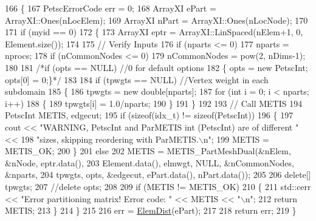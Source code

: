 \begin{DoxyCode}
166 \{
167   PetscErrorCode err = 0;
168   ArrayXI ePart = ArrayXI::Ones(nLocElem);
169   ArrayXI nPart = ArrayXI::Ones(nLocNode);
170 
171   \textcolor{keywordflow}{if} (myid == 0)
172   \{
173     ArrayXI eptr = ArrayXI::LinSpaced(nElem+1, 0, Element.size());
174 
175     \textcolor{comment}{// Verify Inputs}
176     \textcolor{keywordflow}{if} (nparts <= 0)
177       nparts = nprocs;
178     \textcolor{keywordflow}{if} (nCommonNodes <= 0)
179       nCommonNodes = pow(2, nDims-1);
180 
181     \textcolor{comment}{/*if (opts == NULL)                         //0 for default options}
182 \textcolor{comment}{    \{ opts = new PetscInt; opts[0] = 0;\}*/}
183 
184     \textcolor{keywordflow}{if} (tpwgts == NULL)                \textcolor{comment}{//Vertex weight in each subdomain}
185     \{
186       tpwgts = \textcolor{keyword}{new} \textcolor{keywordtype}{double}[nparts];
187       \textcolor{keywordflow}{for} (\textcolor{keywordtype}{int} i = 0; i < nparts; i++)
188       \{
189         tpwgts[i] = 1.0/nparts;
190       \}
191     \}
192 
193     \textcolor{comment}{// Call METIS}
194     PetscInt METIS, edgecut;
195     \textcolor{keywordflow}{if} (\textcolor{keyword}{sizeof}(idx\_t) != \textcolor{keyword}{sizeof}(PetscInt))
196     \{
197       cout << \textcolor{stringliteral}{"WARNING, PetscInt and ParMETIS int (PetscInt) are of different "} <<
198               \textcolor{stringliteral}{"sizes, skipping reordering with ParMETIS.\(\backslash\)n"};
199       METIS = METIS\_OK;
200     \}
201     \textcolor{keywordflow}{else}
202       METIS = METIS\_PartMeshDual(&nElem, &nNode, eptr.data(),
203               Element.data(), elmwgt, NULL, &nCommonNodes, &nparts,
204           tpwgts, opts, &edgecut, ePart.data(), nPart.data());
205 
206     \textcolor{keyword}{delete}[] tpwgts;
207     \textcolor{comment}{//delete opts;}
208 
209     \textcolor{keywordflow}{if} (METIS != METIS\_OK)
210     \{
211       std::cerr << \textcolor{stringliteral}{"Error partitioning matrix! Error code: "} << METIS << \textcolor{stringliteral}{"\(\backslash\)n"};
212       \textcolor{keywordflow}{return} METIS;
213     \}
214   \}
215 
216   err = \mbox{\hyperlink{class_mesh_a1c915802d56c4ded24e460e83cfb5399}{ElemDist}}(ePart);
217 
218   \textcolor{keywordflow}{return} err;
219 \}
\end{DoxyCode}
\mbox{\label{class_mesh_ab9c61b0cf7cbcb8738d0e904fe532e91}} 
